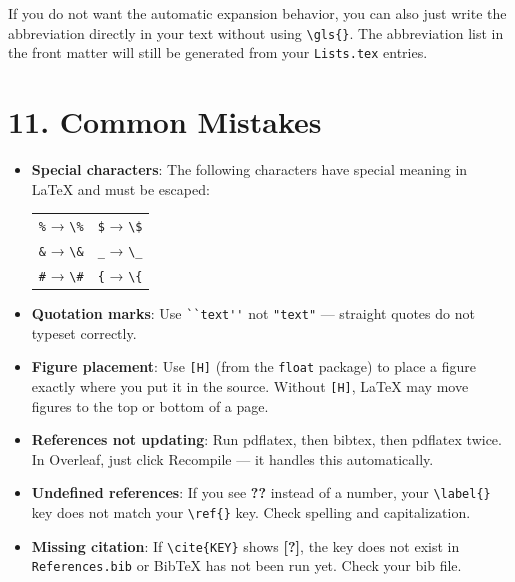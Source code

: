 \noindent
If you do not want the automatic expansion behavior, you can
also just write the abbreviation directly in your text without
using \verb|\gls{}|. The abbreviation list in the front matter
will still be generated from your \texttt{Lists.tex} entries.


\section*{11. Common Mistakes}

\begin{itemize}
    \item \textbf{Special characters}: The following characters
    have special meaning in LaTeX and must be escaped:
    \begin{center}
    \begin{tabular}{ll}
        \texttt{\%} → \texttt{\textbackslash\%} &
        \texttt{\$} → \texttt{\textbackslash\$} \\
        \texttt{\&} → \texttt{\textbackslash\&} &
        \texttt{\_} → \texttt{\textbackslash\_} \\
        \texttt{\#} → \texttt{\textbackslash\#} &
        \texttt{\{} → \texttt{\textbackslash\{} \\
    \end{tabular}
    \end{center}

    \item \textbf{Quotation marks}: Use \verb|``text''| not
    \verb|"text"| — straight quotes do not typeset correctly.

    \item \textbf{Figure placement}: Use \texttt{[H]} (from the
    \texttt{float} package) to place a figure exactly where you
    put it in the source. Without \texttt{[H]}, LaTeX may move
    figures to the top or bottom of a page.

    \item \textbf{References not updating}: Run pdflatex, then
    bibtex, then pdflatex twice. In Overleaf, just click
    Recompile — it handles this automatically.

    \item \textbf{Undefined references}: If you see \textbf{??}
    instead of a number, your \verb|\label{}| key does not match
    your \verb|\ref{}| key. Check spelling and capitalization.

    \item \textbf{Missing citation}: If \verb|\cite{KEY}| shows
    \textbf{[?]}, the key does not exist in \texttt{References.bib}
    or BibTeX has not been run yet. Check your bib file.
\end{itemize}



